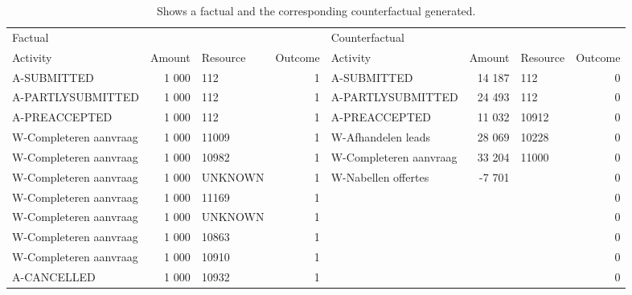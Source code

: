 \begin{table}
\caption{Shows a factual and the corresponding counterfactual generated.}
\label{tbl:example-cf}
\begin{tabular}{lrlrlrlr}
\toprule
\multicolumn{4}{l}{Factual} & \multicolumn{4}{l}{Counterfactual} \\
Activity & Amount & Resource & Outcome & Activity & Amount & Resource & Outcome \\
\midrule
A-SUBMITTED & 1 000 & 112 & 1 & A-SUBMITTED & 14 187 & 112 & 0 \\
A-PARTLYSUBMITTED & 1 000 & 112 & 1 & A-PARTLYSUBMITTED & 24 493 & 112 & 0 \\
A-PREACCEPTED & 1 000 & 112 & 1 & A-PREACCEPTED & 11 032 & 10912 & 0 \\
W-Completeren aanvraag & 1 000 & 11009 & 1 & W-Afhandelen leads & 28 069 & 10228 & 0 \\
W-Completeren aanvraag & 1 000 & 10982 & 1 & W-Completeren aanvraag & 33 204 & 11000 & 0 \\
W-Completeren aanvraag & 1 000 & UNKNOWN & 1 & W-Nabellen offertes & -7 701 &  & 0 \\
W-Completeren aanvraag & 1 000 & 11169 & 1 &  &  &  & 0 \\
W-Completeren aanvraag & 1 000 & UNKNOWN & 1 &  &  &  & 0 \\
W-Completeren aanvraag & 1 000 & 10863 & 1 &  &  &  & 0 \\
W-Completeren aanvraag & 1 000 & 10910 & 1 &  &  &  & 0 \\
A-CANCELLED & 1 000 & 10932 & 1 &  &  &  & 0 \\
\bottomrule
\end{tabular}
\end{table}
